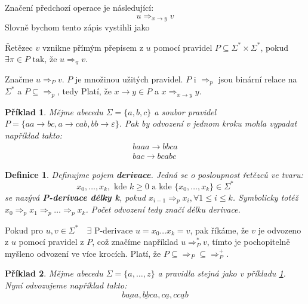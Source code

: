 \documentclass[10pt, a4paper, titlepage]{article}
\theoremstyle{note}
\newtheorem{definice}{\textbf{Definice}}
\newtheorem{priklad}{\textbf{Příklad}}
\begin{document}
Značení předchozí operace je následující:
$$
u \Rightarrow_{x \rightarrow y} v
$$
Slovně bychom tento zápis vystihli jako 

Řetězec $v$ vznikne přímým přepisem z $u$ pomocí pravidel $P \subseteq  \Sigma^{*} \times \Sigma^{*}$, pokud
$\exists \pi \in P \text{ tak, že } u \Rightarrow_{\pi} v$.

Značme $u \Rightarrow_{P} v$. $P$ je množinou užitých pravidel. $P$ i $\Rightarrow_{p}$ jsou binární relace na $\Sigma^{*}$ a
$P \subseteq  \Rightarrow_{p}$, tedy  Platí, že $x \rightarrow y \in P$ a $x \Rightarrow_{x \rightarrow y} y$.

\begin{priklad}
Mějme abecedu $\Sigma = \lbrace a, b, c \rbrace$ a soubor pravidel $P = \lbrace aa \rightarrow bc, a \rightarrow cab, bb \rightarrow \varepsilon \rbrace$\label{priklad-1}.
Pak by odvození v jednom kroku mohla vypadat například takto:
\begin{gather*}
baaa \rightarrow bbca \\
bac \rightarrow bcabc
\end{gather*}
\end{priklad}

\begin{definice}
Definujme pojem \textbf{derivace}. Jedná se o posloupnost řetězců ve tvaru:
$$
x_{0}, \ldots, x_{k},\text{ kde } k \geq 0\text{ a kde } \lbrace x_{0}, \ldots, x_{k} \rbrace \in \Sigma^{*}
$$
se nazývá \textbf{P-derivace délky k}, pokud $x_{i-1} \Rightarrow_{p} x_{i}, \forall 1 \leq i \leq k $.
Symbolicky totéž $x_{0} \Rightarrow_{p} x_{1} \Rightarrow_{p} \ldots \Rightarrow_{p} x_{k}$. Počet odvození tedy značí \emph{délku} derivace.
\end{definice}

Pokud pro $u, v \in \Sigma^{*} \quad \exists \text{ P-derivace } u = x_{0} \ldots x_{k} = v$, pak říkáme, že $v$ je odvozeno z $u$ pomocí pravidel z $P$, což značíme
například $u \Rightarrow_{P}^{*} v$, tímto je pochopitelně myšleno odvození ve více krocích. Platí, že $P \subseteq \Rightarrow_{P} \subseteq \Rightarrow_{P}^{+}$.

\begin{priklad}
Mějme abecedu $\Sigma = \lbrace a, \ldots, z \rbrace$ a pravidla stejná jako v příkladu \ref{priklad-1}.
Nyní odvozujeme například takto:
$$
b\underline{aa}a, \underline{bb}ca, c\underline{a}, c\underline{cab}
$$
\end{priklad}
\end{document}
